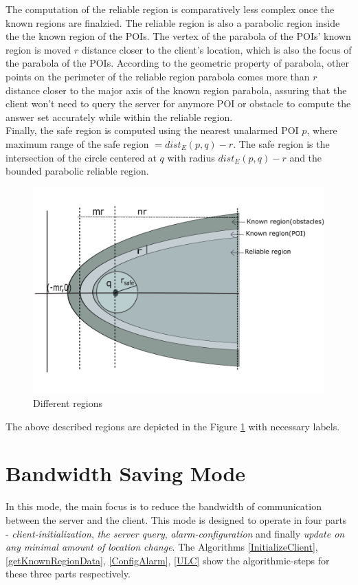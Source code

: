 The computation of the reliable region is comparatively less complex once the known regions are finalzied. The reliable region is also a parabolic region inside the the known region of the POIs. The vertex of the parabola of the POIs' known region is moved $r$ distance closer to the client's location, which is also the focus of the parabola of the POIs. According to the geometric property of parabola, other points on the perimeter of the reliable region parabola comes more than $r$ distance closer to the major axis of the known region parabola, assuring that the client won't need to query the server for anymore POI or obstacle to compute the answer set accurately while within the reliable region.\\

Finally, the safe region is computed using the nearest unalarmed POI $p$, where maximum range of the safe region $ = dist_E(p,q) - r$. The safe region is the intersection of the circle centered at $q$ with radius $dist_E(p,q)-r$ and the bounded parabolic reliable region.

\begin{figure}[h]
  \includegraphics[width=\linewidth]{region.png}
  \caption{Different regions}
  \label{fig:regions}
\end{figure}

The above described regions are depicted in the Figure \ref{fig:regions} with necessary labels.


\section{Bandwidth Saving Mode}
\label{BWS}
In this mode, the main focus is to reduce the bandwidth of communication between the server and the client. This mode is designed to operate in four parts - \textit{client-initialization}, \textit{the server query}, \textit{alarm-configuration} and finally \textit{update on any minimal amount of location change}. The Algorithms \ref{InitializeClient}, \ref{getKnownRegionData}, \ref{ConfigAlarm}, \ref{ULC} show the algorithmic-steps for these three parts respectively.\\


